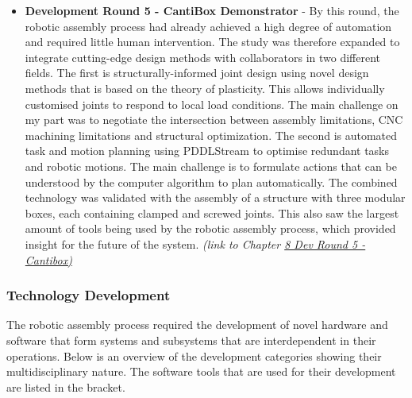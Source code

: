 \documentclass[11pt]{book}
\begin{document}
\begin{itemize}
	\item \textbf{Development Round 5 - CantiBox Demonstrator} - By this round, the robotic assembly process had already achieved a high degree of automation and required little human intervention. The study was therefore expanded to integrate cutting-edge design methods with collaborators in two different fields. The first is structurally-informed joint design using novel design methods that is based on the theory of plasticity. This allows individually customised joints to respond to local load conditions. The main challenge on my part was to negotiate the intersection between assembly limitations, CNC machining limitations and structural optimization. The second is automated task and motion planning using PDDLStream to optimise redundant tasks and robotic motions. The main challenge is to formulate actions that can be understood by the computer algorithm to plan automatically. The combined technology was validated with the assembly of a structure with three modular boxes, each containing clamped and screwed joints. This also saw the largest amount of tools being used by the robotic assembly process, which provided insight for the future of the system. \textit{(link to Chapter \uline{8 Dev Round 5 - Cantibox)}}

\end{itemize}
\subsubsection{Technology Development}

The robotic assembly process required the development of novel hardware and software that form systems and subsystems that are interdependent in their operations. Below is an overview of the development categories showing their multidisciplinary nature. The software tools that are used for their development are listed in the bracket. 
\end{document}
